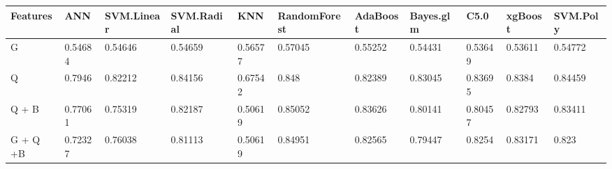 \begin{tabular}{lllllllllll}
  \hline
Features & ANN & SVM.Linear & SVM.Radial & KNN & RandomForest & AdaBoost & Bayes.glm & C5.0 & xgBoost & SVM.Poly \\ 
  \hline
G & 0.54684 & 0.54646 & 0.54659 & 0.56577 & 0.57045 & 0.55252 & 0.54431 & 0.53649 & 0.53611 & 0.54772 \\ 
  Q & 0.7946 & 0.82212 & 0.84156 & 0.67542 & 0.848 & 0.82389 & 0.83045 & 0.83695 & 0.8384 & 0.84459 \\ 
  Q + B & 0.77061 & 0.75319 & 0.82187 & 0.50619 & 0.85052 & 0.83626 & 0.80141 & 0.80457 & 0.82793 & 0.83411 \\ 
  G + Q +B & 0.72327 & 0.76038 & 0.81113 & 0.50619 & 0.84951 & 0.82565 & 0.79447 & 0.8254 & 0.83171 & 0.823 \\ 
   \hline
\end{tabular}

